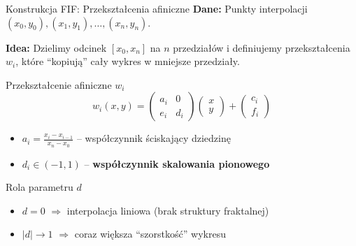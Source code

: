 \documentclass[10pt]{beamer}
\begin{document}
\begin{frame}{Konstrukcja FIF: Przekształcenia afiniczne}
    \textbf{Dane:} Punkty interpolacji $(x_0, y_0), (x_1, y_1), \ldots, (x_n, y_n)$.

    \vspace{0.2cm}
    \textbf{Idea:} Dzielimy odcinek $[x_0, x_n]$ na $n$ przedziałów i definiujemy przekształcenia $w_i$, które ``kopiują'' cały wykres w mniejsze przedziały.

    \vspace{0.2cm}
    \begin{block}{Przekształcenie afiniczne $w_i$}
        \[
        w_i(x, y) = \begin{pmatrix} a_i & 0 \\ e_i & d_i \end{pmatrix} \begin{pmatrix} x \\ y \end{pmatrix} + \begin{pmatrix} c_i \\ f_i \end{pmatrix}
        \]
        \begin{itemize}
            \item $a_i = \frac{x_i - x_{i-1}}{x_n - x_0}$ -- współczynnik ściskający dziedzinę
            \item $d_i \in (-1, 1)$ -- \textbf{współczynnik skalowania pionowego}
        \end{itemize}
    \end{block}

    \vspace{0.2cm}
    \begin{alertblock}{Rola parametru $d$}
        \begin{itemize}
            \item $d = 0$ $\Rightarrow$ interpolacja liniowa (brak struktury fraktalnej)
            \item $|d| \to 1$ $\Rightarrow$ coraz większa ``szorstkość'' wykresu
        \end{itemize}
    \end{alertblock}
\end{frame}
\end{document}
